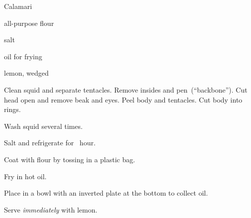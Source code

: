 \begin{recipe}{Calamari}{}{}

\begin{ingredients}
\item {}
\item all-purpose flour
\item salt
\item oil for frying
\item lemon, wedged
\end{ingredients}

\begin{directions}
\item Clean squid and separate tentacles. Remove insides and pen~(``backbone''). Cut head open and remove beak and eyes. Peel body and tentacles. Cut body into rings. 
\item Wash squid several times.
\item Salt and refrigerate for \half~hour.
\item Coat with flour by tossing in a plastic bag.
\item Fry in hot oil.
\item Place in a bowl with an inverted plate at the bottom to collect oil.
\item Serve \emph{immediately} with lemon.
\end{directions}

\end{recipe}
